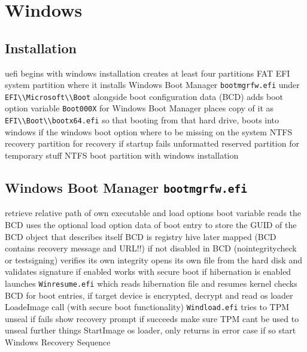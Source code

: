 
\section{Windows}

\subsection{Installation}
uefi begins with windows installation
creates at least four partitions
FAT EFI system partition
where it installs Windows Boot Manager \lstinline{bootmgrfw.efi} under \lstinline{EFI\\Microsoft\\Boot} alongside boot configuration data (BCD)
adds boot option variable \lstinline{Boot000X} for Windows Boot Manager
places copy of it as \lstinline{EFI\\Boot\\bootx64.efi} so that booting from that hard drive, boots into windows if the windows boot option where to be missing on the system
NTFS recovery partition for recovery if startup fails
unformatted reserved partition for temporary stuff
NTFS boot partition with windows installation
\cite[12. The UEFI boot]{windows-internals-7-part2}

\subsection{Windows Boot Manager \lstinline{bootmgrfw.efi}}
retrieve relative path of own executable and load options boot variable
reads the BCD
uses the optional load option data of boot entry to store the GUID of the BCD object that describes itself
BCD is registry hive later mapped (BCD contains recovery message and URL!!)
if not disabled in BCD (nointegritycheck or testsigning) verifies its own integrity
opens its own file from the hard disk and validates signature
if enabled works with secure boot
if hibernation is enabled launches \lstinline{Winresume.efi} which reads hibernation file and resumes kernel
checks BCD for boot entries, if target device is encrypted, decrypt and read os loader LoadeImage call (with secure boot functionality) \lstinline{Windload.efi}
tries to TPM unseal
if fails show recovery prompt
if succeeds make sure TPM cant be used to unseal further things
StartImage os loader, only returns in error case
if so start Windows Recovery Sequence
\cite[12. The Windows Boot Manager]{windows-internals-7-part2}


